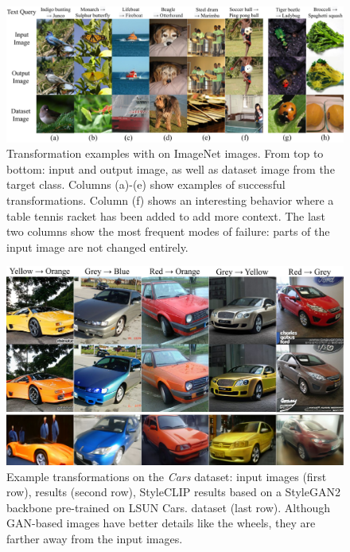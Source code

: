 \begin{figure}[H]
    \centering
    \includegraphics[width=\linewidth]{images/flexit/assets/main_exs.pdf}
    \caption{Transformation examples with \ours on ImageNet images. 
    From top to bottom: input and output image, as well as dataset image from the target
     class.
    Columns (a)-(e) show examples of successful transformations. Column (f) shows an
     interesting behavior where a table tennis racket has been added to add more context. The  last two columns 
      show the most frequent modes of failure: parts of the input image are not changed entirely.
    }
\label{fig:visuresu}
\end{figure}


\begin{figure}[H]
    \centering
    \includegraphics[width=\linewidth]{images/flexit/assets/cars2.pdf}
    \caption{Example  transformations on the \textit{Cars} dataset:  input images (first row),  \ours results  (second row), StyleCLIP results based on a  StyleGAN2 backbone pre-trained on LSUN Cars.
    dataset (last row). Although GAN-based images have better details like the wheels, they are farther away from the input images.}
\label{fig:cars30k}
\end{figure}



